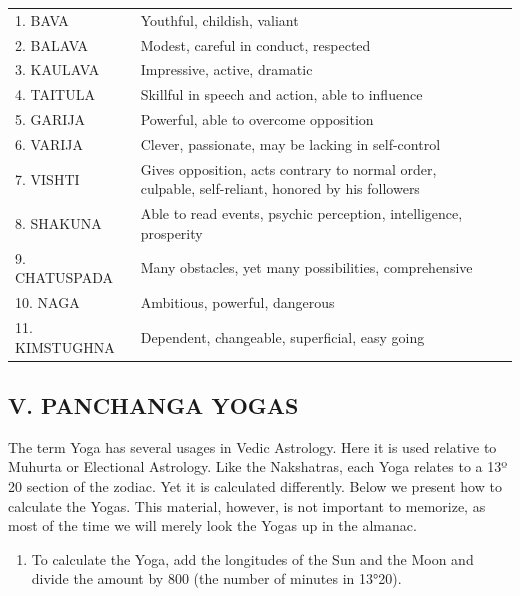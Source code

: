 \begin{enumerate}
 
\begin{center}
\begin{tabular}{ l l l}
1. BAVA	&Youthful, childish, valiant                         \\
2. BALAVA	&Modest, careful in conduct, respected                        \\
3. KAULAVA	&Impressive, active, dramatic                        \\
4. TAITULA	&Skillful in speech and action, able to influence                        \\
5. GARIJA	&Powerful, able to overcome opposition                        \\
6. VARIJA	&Clever, passionate, may be lacking in self-control                        \\
7. VISHTI	&Gives opposition, acts contrary to normal order, culpable, self-reliant, honored by his followers                        \\
8. SHAKUNA	&Able to read events, psychic perception, intelligence, prosperity                        \\
9. CHATUSPADA	&Many obstacles, yet many possibilities, comprehensive                        \\
10. NAGA	&Ambitious, powerful, dangerous                        \\
11. KIMSTUGHNA	&Dependent, changeable, superficial, easy going                        \\
\end{tabular}
\end{center}
 

 

\subsection{V. PANCHANGA YOGAS}
 

The term Yoga has several usages in Vedic Astrology. Here it is used relative to Muhurta or Electional Astrology. Like the Nakshatras, each Yoga relates to a 13º 20 section of the zodiac. Yet it is calculated differently. Below we present how to calculate the Yogas. This material, however, is not important to memorize, as most of the time we will merely look the Yogas up in the almanac.

 
\begin{enumerate} 
\item[] To calculate the Yoga, add the longitudes of the Sun and the Moon and divide the amount by 800 (the number of minutes in 13°20).


\end{enumerate}
\end{enumerate}
